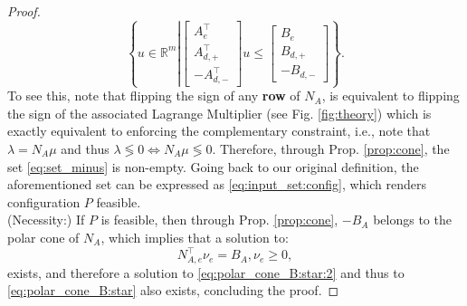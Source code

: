 \documentclass[letterpaper, 10 pt, conference]{ieeeconf}  %
\begin{document}
\begin{proof}
\begin{equation}\label{eq:set_minus}
    \left\{
        u\in\mathbb{R}^m 
        \left|
            \begin{bmatrix}
                A_{e}^\top \\
                A_{d,+}^\top \\
                -A_{d,-}^\top
            \end{bmatrix} u 
            \leq 
            \begin{bmatrix}
                B_{e} \\
                B_{d,+} \\
                -B_{d,-}
            \end{bmatrix}
        \right.
    \right\}.
\end{equation}
{
\color{red}
To see this, note that flipping the sign of any \textbf{row} of $N_A$, is equivalent to flipping the sign of the associated Lagrange Multiplier (see Fig. \ref{fig:theory}) which is exactly equivalent to enforcing the complementary constraint, i.e., note that $\lambda = N_A \mu $ and thus $\lambda \lessgtr 0 \Leftrightarrow  N_A \mu \lessgtr 0 $.
}
Therefore, through Prop. \ref{prop:cone}, the set \eqref{eq:set_minus} is non-empty. Going back to our original definition, the aforementioned set can  be expressed as \eqref{eq:input_set:config}, which renders configuration $P$ feasible. 
\\
(Necessity:) If $P$ is feasible, then through Prop. \ref{prop:cone}, $-B_A$ belongs to the polar cone of $N_A$, which implies that a solution to:
\begin{equation}
         N_{A,e}^\top
        \nu_e  = B_{A}, \nu_e\geq 0,
\end{equation}
exists, and therefore a solution to \eqref{eq:polar_cone_B:star:2} and thus to \eqref{eq:polar_cone_B:star} also exists, concluding the proof. 
\end{proof}
\end{document}
